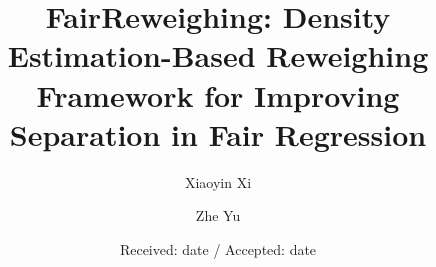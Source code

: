 \usepackage[skins]{tcolorbox}


\newenvironment{RQ}{\vspace{2mm}\begin{tcolorbox}[enhanced,width=\linewidth,size=fbox,colback=blue!5,drop shadow southeast,sharp corners]}{\end{tcolorbox}}
%
%
%
%
%


\title{FairReweighing: Density Estimation-Based Reweighing Framework for Improving Separation in Fair Regression%
}


\author{Xiaoyin Xi         \and
        Zhe Yu %
}



\date{Received: date / Accepted: date}


\maketitle

